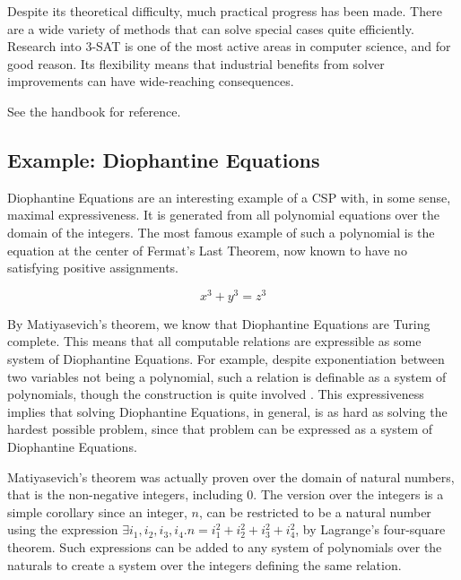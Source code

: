 Despite its theoretical difficulty, much practical progress has been made. There are a wide variety of methods that can solve special cases quite efficiently. Research into 3-SAT is one of the most active areas in computer science, and for good reason. Its flexibility means that industrial benefits from solver improvements can have wide-reaching consequences.

See the handbook \citep{biere2009handbook} for reference.

\subsection{Example: Diophantine Equations}\label{sec:diophantine}

Diophantine Equations are an interesting example of a CSP with, in some sense, maximal expressiveness. It is generated from all polynomial equations over the domain of the integers. The most famous example of such a polynomial is the equation at the center of Fermat's Last Theorem, now known to have no satisfying positive assignments.

\begin{equation}
    x^3 + y^3 = z^3
\end{equation}

By Matiyasevich's theorem, we know that Diophantine Equations are Turing complete. This means that all computable relations are expressible as some system of Diophantine Equations. For example, despite exponentiation between two variables not being a polynomial, such a relation is definable as a system of polynomials, though the construction is quite involved \citep{matiyasevich1993hilbert}. This expressiveness implies that solving Diophantine Equations, in general, is as hard as solving the hardest possible problem, since that problem can be expressed as a system of Diophantine Equations.

\begin{remark}\label{remark:natural-mat}
Matiyasevich's theorem was actually proven over the domain of natural numbers, that is the non-negative integers, including 0. The version over the integers is a simple corollary since an integer, $n$, can be restricted to be a natural number using the expression $\exists i_1, i_2, i_3, i_4. n = i_1^2 + i_2^2 + i_3^2 + i_4^2$, by Lagrange's four-square theorem. Such expressions can be added to any system of polynomials over the naturals to create a system over the integers defining the same relation.
\end{remark}

